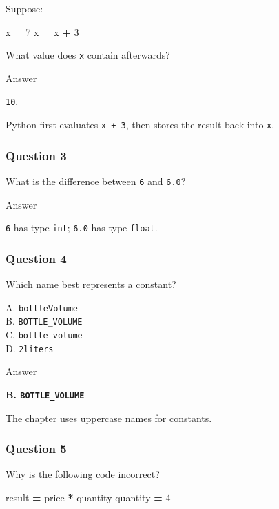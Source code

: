 \documentclass[
]{article}
\newenvironment{Shaded}{\begin{snugshade}}{\end{snugshade}}
\newcommand{\DecValTok}[1]{\textcolor[rgb]{0.00,0.00,0.81}{#1}}
\newcommand{\NormalTok}[1]{#1}
\newcommand{\OperatorTok}[1]{\textcolor[rgb]{0.81,0.36,0.00}{\textbf{#1}}}
\begin{document}
Suppose:

\begin{Shaded}
\begin{Highlighting}[]
\NormalTok{x }\OperatorTok{=} \DecValTok{7}
\NormalTok{x }\OperatorTok{=}\NormalTok{ x }\OperatorTok{+} \DecValTok{3}
\end{Highlighting}
\end{Shaded}

What value does \texttt{x} contain afterwards?

Answer

\texttt{10}.

Python first evaluates \texttt{x\ +\ 3}, then stores the result back
into \texttt{x}.

\subsubsection{Question 3}\label{question-3}

What is the difference between \texttt{6} and \texttt{6.0}?

Answer

\texttt{6} has type \texttt{int}; \texttt{6.0} has type \texttt{float}.

\subsubsection{Question 4}\label{question-4}

Which name best represents a constant?

A. \texttt{bottleVolume}\\
B. \texttt{BOTTLE\_VOLUME}\\
C. \texttt{bottle\ volume}\\
D. \texttt{2liters}

Answer

\textbf{B. \texttt{BOTTLE\_VOLUME}}

The chapter uses uppercase names for constants.

\subsubsection{Question 5}\label{question-5}

Why is the following code incorrect?

\begin{Shaded}
\begin{Highlighting}[]
\NormalTok{result }\OperatorTok{=}\NormalTok{ price }\OperatorTok{*}\NormalTok{ quantity}
\NormalTok{quantity }\OperatorTok{=} \DecValTok{4}
\end{Highlighting}
\end{Shaded}
\end{document}
